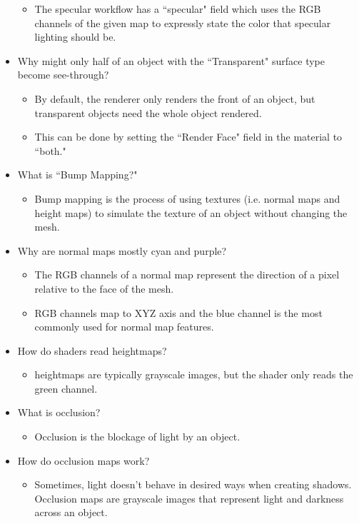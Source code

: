 \documentclass{article}
\begin{document}
\begin{itemize}
\begin{itemize}
        \item The specular workflow has a ``specular" field which uses the RGB channels of the given map to expressly state the color that specular lighting should be.
    \end{itemize}
    \item Why might only half of an object with the ``Transparent" surface type become see-through?
    \begin{itemize}
        \item By default, the renderer only renders the front of an object, but transparent objects need the whole object rendered.
        \item This can be done by setting the ``Render Face" field in the material to ``both."
    \end{itemize}
    \item What is ``Bump Mapping?"
    \begin{itemize}
        \item Bump mapping is the process of using textures (i.e. normal maps and height maps) to simulate the texture of an object without changing the mesh.
    \end{itemize}
    \item Why are normal maps mostly cyan and purple?
    \begin{itemize}
        \item The RGB channels of a normal map represent the direction of a pixel relative to the face of the mesh.
        \item RGB channels map to XYZ axis and the blue channel is the most commonly used for normal map features.
    \end{itemize}
    \item How do shaders read heightmaps?
    \begin{itemize}
        \item heightmaps are typically grayscale images, but the shader only reads the green channel.
    \end{itemize}
    \item What is occlusion?
    \begin{itemize}
        \item Occlusion is the blockage of light by an object.
    \end{itemize}
    \item How do occlusion maps work?
    \begin{itemize}
        \item Sometimes, light doesn't behave in desired ways when creating shadows. Occlusion maps are grayscale images that represent light and darkness across an object.

\end{itemize}
\end{itemize}
\end{document}

